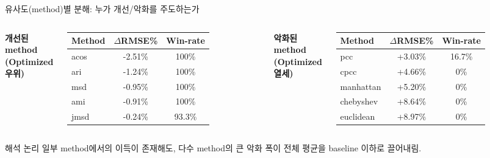 \documentclass[aspectratio=169,10pt]{beamer}
\begin{document}
\begin{frame}[shrink=5]{유사도(method)별 분해: 누가 개선/악화를 주도하는가}
	\begin{columns}[T]
			\textbf{개선된 method (Optimized 우위)}
			\renewcommand{\arraystretch}{1.2}
			\begin{tabular}{l|c|c}
				\toprule
				Method & \(\Delta\)RMSE\% & Win-rate \\
				\midrule
				acos    & -2.51\% & 100\% \\
				ari     & -1.24\% & 100\% \\
				msd     & -0.95\% & 100\% \\
				ami     & -0.91\% & 100\% \\
				jmsd    & -0.24\% & 93.3\% \\
				\bottomrule
			\end{tabular}

			\textbf{악화된 method (Optimized 열세)}
			\renewcommand{\arraystretch}{1.2}
			\begin{tabular}{l|c|c}
				\toprule
				Method & \(\Delta\)RMSE\% & Win-rate \\
				\midrule
				pcc       & +3.03\% & 16.7\% \\
				cpcc      & +4.66\% & 0\% \\
				manhattan & +5.20\% & 0\% \\
				chebyshev & +8.64\% & 0\% \\
				euclidean & +8.97\% & 0\% \\
				\bottomrule
			\end{tabular}
	\end{columns}

	\vspace{0.4em}
	\begin{alertblock}{해석 논리}
		일부 method에서의 이득이 존재해도,
		다수 method의 큰 악화 폭이 전체 평균을 baseline 이하로 끌어내림.
	\end{alertblock}
\end{frame}
\end{document}
